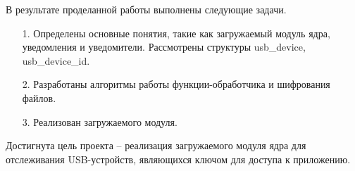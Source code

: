 \Conclusion %

\hfill

В результате проделанной работы выполнены следующие задачи.
\begin{enumerate}
		\item[1. ] Определены основные понятия, такие как загружаемый модуль ядра, уведомления и уведомители. Рассмотрены структуры usb\_device, usb\_device\_id. 
		\item[2. ] Разработаны алгоритмы работы функции-обработчика и шифрования файлов. 
		\item[3. ] Реализован загружаемого модуля. 
	\end{enumerate}
	
Достигнута цель проекта -- реализация загружаемого модуля ядра для отслеживания USB-устройств, являющихся ключом для доступа к приложению. 
